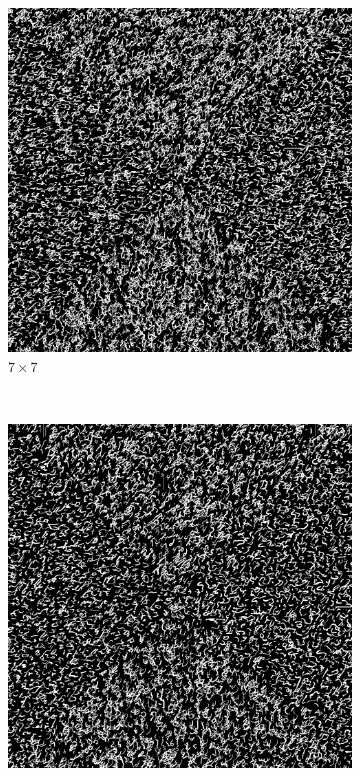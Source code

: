 \documentclass{article}
\begin{document}
\begin{figure}
\begin{subfigure}{0.45\textwidth}
        \includegraphics[width=\linewidth]{../Result/mnist-patch-7.png}
        \caption{$7 \times 7$}
        \label{fig:mnist-patch-7}
    \end{subfigure}
    \\
    \begin{subfigure}{0.45\textwidth}
        \centering
        \includegraphics[width=\linewidth]{../Result/mnist-patch-9.png}

\end{subfigure}
\end{figure}
\end{document}
